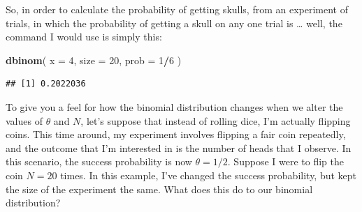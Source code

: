 \documentclass[]{book}
\newenvironment{Shaded}{\begin{snugshade}}{\end{snugshade}}
\newcommand{\DataTypeTok}[1]{\textcolor[rgb]{0.13,0.29,0.53}{#1}}
\newcommand{\DecValTok}[1]{\textcolor[rgb]{0.00,0.00,0.81}{#1}}
\newcommand{\KeywordTok}[1]{\textcolor[rgb]{0.13,0.29,0.53}{\textbf{#1}}}
\newcommand{\NormalTok}[1]{#1}
\newcommand{\OperatorTok}[1]{\textcolor[rgb]{0.81,0.36,0.00}{\textbf{#1}}}
\begin{document}
So, in order to calculate the probability of getting skulls, from an experiment of trials, in which the probability of getting a skull on any one trial is \ldots{} well, the command I would use is simply this:

\begin{Shaded}
\begin{Highlighting}[]
\KeywordTok{dbinom}\NormalTok{( }\DataTypeTok{x =} \DecValTok{4}\NormalTok{, }\DataTypeTok{size =} \DecValTok{20}\NormalTok{, }\DataTypeTok{prob =} \DecValTok{1}\OperatorTok{/}\DecValTok{6}\NormalTok{ )}
\end{Highlighting}
\end{Shaded}

\begin{verbatim}
## [1] 0.2022036
\end{verbatim}

To give you a feel for how the binomial distribution changes when we alter the values of \(\theta\) and \(N\), let's suppose that instead of rolling dice, I'm actually flipping coins. This time around, my experiment involves flipping a fair coin repeatedly, and the outcome that I'm interested in is the number of heads that I observe. In this scenario, the success probability is now \(\theta = 1/2\). Suppose I were to flip the coin \(N=20\) times. In this example, I've changed the success probability, but kept the size of the experiment the same. What does this do to our binomial distribution?
\end{document}
